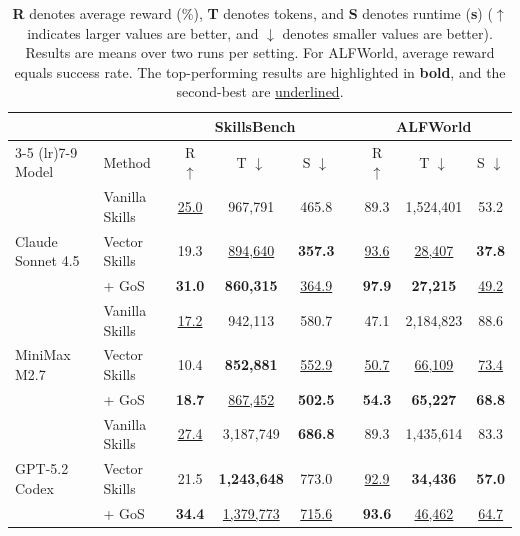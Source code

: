 \begin{table}[t]
\caption{\textbf{R} denotes average reward (\%), \textbf{T} denotes tokens, and \textbf{S} denotes runtime (\textbf{s}) ($\uparrow$ indicates larger values are better, and $\downarrow$ denotes smaller values are better). Results are means over two runs per setting. For ALFWorld, average reward equals success rate. The top-performing results are highlighted in \textbf{bold}, and the second-best are \underline{underlined}.}
\label{results-table}
\centering
\small
\setlength{\tabcolsep}{6pt}
\begin{tabular}{ll ccc c ccc}
\toprule
& & \multicolumn{3}{c}{SkillsBench} & & \multicolumn{3}{c}{ALFWorld} \\
\cmidrule(lr){3-5} \cmidrule(lr){7-9}
Model & Method & R $\uparrow$ & T $\downarrow$ & S $\downarrow$ & & R $\uparrow$ & T $\downarrow$ & S $\downarrow$ \\
\midrule
& Vanilla Skills & \underline{25.0} & 967,791 & 465.8 & & 89.3 & 1,524,401 & 53.2 \\
Claude Sonnet 4.5 & Vector Skills & 19.3 & \underline{894,640} & \textbf{357.3} & & \underline{93.6} & \underline{28,407} & \textbf{37.8} \\
& + GoS & \textbf{31.0} & \textbf{860,315} & \underline{364.9} & & \textbf{97.9} & \textbf{27,215} & \underline{49.2} \\
\midrule
& Vanilla Skills & \underline{17.2} & 942,113 & 580.7 & & 47.1 & 2,184,823 & 88.6 \\
MiniMax M2.7 & Vector Skills & 10.4 & \textbf{852,881} & \underline{552.9} & & \underline{50.7} & \underline{66,109} & \underline{73.4} \\
& + GoS & \textbf{18.7} & \underline{867,452} & \textbf{502.5} & & \textbf{54.3} & \textbf{65,227} & \textbf{68.8} \\
\midrule
& Vanilla Skills & \underline{27.4} & 3,187,749 & \textbf{686.8} & & 89.3 & 1,435,614 & 83.3 \\
GPT-5.2 Codex & Vector Skills & 21.5 & \textbf{1,243,648} & 773.0 & & \underline{92.9} & \textbf{34,436} & \textbf{57.0} \\
& + GoS & \textbf{34.4} & \underline{1,379,773} & \underline{715.6} & & \textbf{93.6} & \underline{46,462} & \underline{64.7} \\
\bottomrule
\end{tabular}
\end{table}